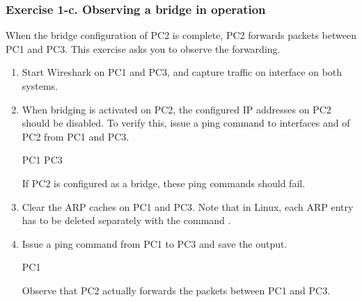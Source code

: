 

\subsubsection{Exercise 1-c. Observing a bridge in operation}

When the bridge configuration of PC2 is complete, PC2 forwards packets between PC1 and PC3. This exercise asks you to observe the forwarding.
\begin{enumerate}
	\item Start Wireshark on PC1 and PC3, and capture traffic on interface  on both systems.
	\item When bridging is activated on PC2, the configured IP addresses on PC2 should be disabled. To verify this, issue a ping command to interfaces  and  of PC2 from PC1 and PC3.
		\begin{cmdblock}
	PC1%
	PC3%
		\end{cmdblock}
		If PC2 is configured as a bridge, these ping commands should fail.
	\item Clear the ARP caches on PC1 and PC3. Note that in Linux, each ARP entry has to be deleted separately with the command .
	\item Issue a ping command from PC1 to PC3 and save the output.
		\begin{cmdblock}
	PC1%
		\end{cmdblock}
		Observe that PC2 actually forwards the packets between PC1 and PC3.
\end{enumerate}

